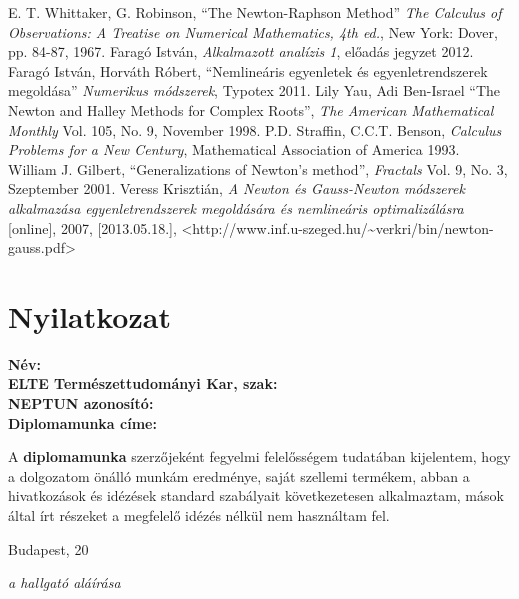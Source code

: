 \documentclass[a4paper,12pt]{report}
\begin{document}
	\begin{thebibliography}{99}
    	 E. T. Whittaker, G. Robinson, ``The Newton-Raphson Method'' \emph{The Calculus of Observations: A Treatise on Numerical Mathematics, 4th ed.}, New York: Dover, pp. 84-87, 1967.
		 Faragó István, \emph{Alkalmazott analízis 1}, előadás jegyzet 2012.
         Faragó István, Horváth Róbert, ``Nemlineáris egyenletek és egyenletrendszerek megoldása'' \emph{Numerikus módszerek}, Typotex 2011.
         Lily Yau, Adi Ben-Israel ``The Newton and Halley Methods for Complex Roots'', \emph{The American Mathematical Monthly} Vol. 105, No. 9, November 1998. %
		 P.D. Straffin, C.C.T. Benson, \emph{Calculus Problems for a New Century}, Mathematical Association of America 1993.
	 William J. Gilbert, ``Generalizations of Newton's method'', \emph{Fractals} Vol. 9, No. 3,  Szeptember 2001.
	 Veress Krisztián, \emph{A Newton és Gauss-Newton módszerek alkalmazása egyenletrendszerek megoldására és nemlineáris optimalizálásra} [online], 2007, [2013.05.18.], <http://www.inf.u-szeged.hu/\textasciitilde verkri/bin/newton-gauss.pdf>

	\end{thebibliography}

\chapter*{Nyilatkozat}
\thispagestyle{empty}
\textbf{Név:\\ELTE Természettudományi Kar, szak:\\NEPTUN azonosító:\\Diplomamunka címe:}

\vspace{60pt}
A \textbf{diplomamunka} szerzőjeként fegyelmi felelősségem tudatában kijelentem, hogy a dolgozatom önálló munkám eredménye, saját szellemi termékem, abban a hivatkozások és idézések standard szabályait következetesen alkalmaztam, mások által írt részeket a megfelelő idézés nélkül nem használtam fel.


\vspace{30pt}
Budapest, 20\hfill\makebox[2.5in]{\hrulefill} \begin{flushright}\textit{a hallgató aláírása}\end{flushright}
\end{document}
